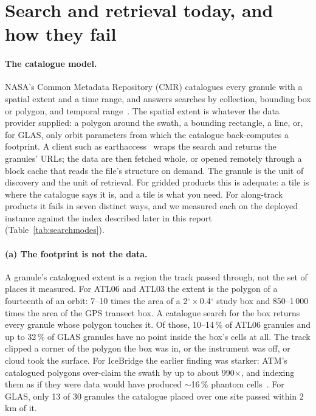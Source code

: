 \documentclass[10pt,a4paper]{article}
\begin{document}
\section{Search and retrieval today, and how they fail}
\label{ch:failures}

\paragraph{The catalogue model.} NASA's Common Metadata Repository (CMR) catalogues every granule with a spatial
extent and a time range, and answers searches by collection, bounding box or polygon, and temporal
range~\citep{cmrapi}. The spatial extent is whatever the data provider supplied: a polygon around the swath, a
bounding rectangle, a line, or, for GLAS, only orbit parameters from which the catalogue back-computes a footprint.
A client such as earthaccess~\citep{earthaccess} wraps the search and returns the granules' URLs; the data are then
fetched whole, or opened remotely through a block cache that reads the file's structure on demand. The granule is
the unit of discovery and the unit of retrieval. For gridded products this is adequate: a tile is where the
catalogue says it is, and a tile is what you need. For along-track products it fails in seven distinct ways, and we
measured each on the deployed instance against the index described later in this report
(Table~\ref{tab:searchmodes}).

\paragraph{(a) The footprint is not the data.} A granule's catalogued extent is a region the track passed through,
not the set of places it measured. For ATL06 and ATL03 the extent is the polygon of a fourteenth of an orbit:
7--10 times the area of a 2$^\circ\times$0.4$^\circ$ study box and 850--1\,000 times the area of the GPS transect
box. A catalogue search for the box returns every granule whose polygon touches it. Of those, 10--14\,\% of ATL06
granules and up to 32\,\% of GLAS granules have no point inside the box's cells at all. The track clipped a corner
of the polygon the box was in, or the instrument was off, or cloud took the surface. For IceBridge the earlier
finding was starker: ATM's catalogued polygons over-claim the swath by up to about 990$\times$, and indexing them as
if they were data would have produced $\sim$16\,\% phantom cells~\citep{krabill2002}. For GLAS, only 13 of 30
granules the catalogue placed over one site passed within 2\,km of it.
\end{document}
